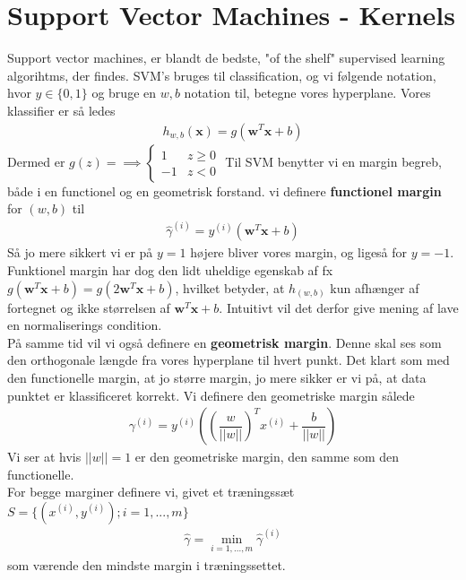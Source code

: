 \documentclass[paper=a4, fontsize=11pt]{scrartcl} %
\numberwithin{equation}{section} %
\numberwithin{figure}{section} %
\numberwithin{table}{section} %
\begin{document}
	\newpage
	
	\section*{Support Vector Machines - Kernels}
	
	Support vector machines, er blandt de bedste, "of the shelf" supervised learning algorihtms, der findes. SVM's bruges til classification, og vi følgende notation, hvor $y\in\{0,1\}$ og bruge en $w,b$ notation til, betegne vores hyperplane. Vores klassifier er så ledes
	\begin{align*}
	h_{w,b}(\mathbf{x})=g(\mathbf{w}^T\mathbf{x}+b)
	\end{align*}
	Dermed er $g(z)=\implies\begin{cases}
	1 & z\geq0 \\
	-1 & z<0
	\end{cases}$
	Til SVM benytter vi en margin begreb, både i en functionel og en geometrisk forstand. vi definere \textbf{functionel margin} for $(w,b)$ til
	\begin{align*}
	\hat{\gamma}^{(i)}=y^{(i)}(\mathbf{w}^T\mathbf{x}+b)
	\end{align*}
	Så jo mere sikkert vi er på $y=1$ højere bliver vores margin, og ligeså for $y=-1$. Funktionel margin har dog den lidt uheldige egenskab af fx $g(\mathbf{w}^T\mathbf{x}+b)=g(2\mathbf{w}^T\mathbf{x}+b)$, hvilket betyder, at $h_{(w,b)}$ kun afhænger af fortegnet og ikke størrelsen af $\mathbf{w}^T\mathbf{x}+b$. Intuitivt vil det derfor give mening af lave en normaliserings condition. \\
	
	På samme tid vil vi også definere en \textbf{geometrisk margin}. Denne skal ses som den orthogonale længde fra vores hyperplane til hvert punkt. Det klart som med den functionelle margin, at jo større margin, jo mere sikker er vi på, at data punktet er klassificeret korrekt. Vi definere den geometriske margin sålede
	\begin{align*}
	\gamma^{(i)}=y^{(i)}\left(\left(\dfrac{w}{||w||}\right)^Tx^{(i)}+\dfrac{b}{||w||}\right)
	\end{align*}
	Vi ser at hvis $||w||=1$ er den geometriske margin, den samme som den functionelle. \\
	
	For begge marginer definere vi, givet et træningssæt $S=\{(x^{(i)},y^{(i)});i=1,...,m\}$ 
	\begin{align*}
	\hat{\gamma}=\underset{i=1,...,m}{\min}\hat{\gamma}^{(i)}
	\end{align*}
	som værende den mindste margin i træningssettet. \\
	
\end{document}
